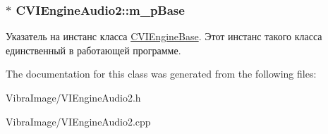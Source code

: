 \hypertarget{class_c_v_i_engine_audio2_a63d3b5cc992e619dc07d688c16403af2}{
\subsubsection[{m\+\_\+p\+Base}]{$\ast$ C\+V\+I\+Engine\+Audio2\+::m\+\_\+p\+Base\hspace{0.3cm}{\ttfamily [protected]}}}\label{class_c_v_i_engine_audio2_a63d3b5cc992e619dc07d688c16403af2}


Указатель на инстанс класса \hyperlink{class_c_v_i_engine_base}{C\+V\+I\+Engine\+Base}. Этот инстанс такого класса единственный в работающей программе. 



The documentation for this class was generated from the following files\+:\begin{DoxyCompactItemize}
\item 
Vibra\+Image/V\+I\+Engine\+Audio2.\+h\item 
Vibra\+Image/V\+I\+Engine\+Audio2.\+cpp\end{DoxyCompactItemize}
